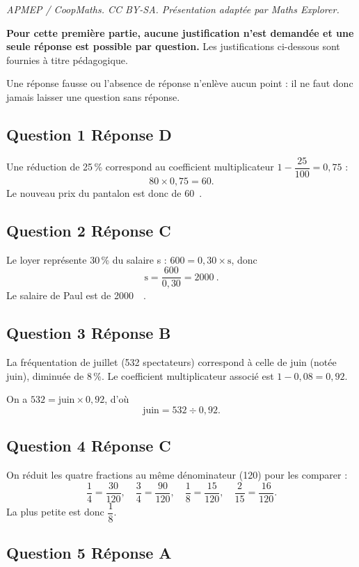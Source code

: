\documentclass[10pt]{article}
\providecommand{\euro}{\texteuro}
\providecommand{\np}[2][]{{#2~#1}}
\providecommand{\euro}{{\text{€}}}
\renewcommand{\euro}{\ifmmode\text{\texteuro}\else\texteuro\fi}
\begin{document}
\noindent\textit{APMEP / CoopMaths. CC BY-SA. Présentation adaptée par Maths Explorer.}\par\medskip
\textbf{Pour cette première partie, aucune justification n'est demandée et une seule réponse est possible par question.} Les justifications ci-dessous sont fournies à titre pédagogique.

Une réponse fausse ou l'absence de réponse n'enlève aucun point : il ne faut donc jamais laisser une question sans réponse.

\subsection*{Question 1 \quad Réponse D}

Une réduction de 25\,\% correspond au coefficient multiplicateur
$1 - \dfrac{25}{100} = 0,75$ :
\[80 \times 0,75 = 60.\]
Le nouveau prix du pantalon est donc de 60~\euro.

\subsection*{Question 2 \quad Réponse C}

Le loyer représente 30\,\% du salaire s : $600 = 0,30 \times \text{s}$, donc
\[ \text{s} = \dfrac{600}{0,30} = \np{2000}.\]
Le salaire de Paul est de \np{2000}~\euro.

\subsection*{Question 3 \quad Réponse B}

La fréquentation de juillet (532 spectateurs) correspond à celle de juin (notée juin), diminuée de 8\,\%. Le coefficient multiplicateur associé est $1-0,08=0,92$.

On a
$532 = \text{juin} \times 0,92$, d'où
\[\text{juin} = 532 \div 0,92.\]

\subsection*{Question 4 \quad Réponse C}

On réduit les quatre fractions au même dénominateur (120) pour les comparer :
\[\dfrac{1}{4} = \dfrac{30}{120}, \quad \dfrac{3}{4} = \dfrac{90}{120}, \quad
\dfrac{1}{8} = \dfrac{15}{120}, \quad \dfrac{2}{15} = \dfrac{16}{120}.\]
La plus petite est donc $\dfrac{1}{8}$.

\subsection*{Question 5 \quad Réponse A}
\end{document}
